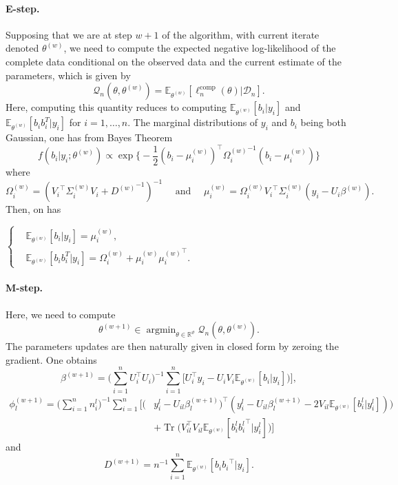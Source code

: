 \documentclass[11pt]{article}
\DeclareMathOperator{\argmin}{argmin}
\DeclareMathOperator{\Tr}{Tr}
\newcommand{\cD}{\mathcal D}
\newcommand{\cQ}{\mathcal Q}
\newcommand{\R}{\mathds R}
\newcommand{\E}{\mathds E}
\begin{document}
\paragraph*{E-step.}
Supposing that we are at step $w + 1$ of the algorithm, with current iterate denoted $\theta^{(w)}$, we need to compute the expected negative log-likelihood of the complete data conditional on the observed data and the current estimate of the parameters, which is given by 
\[\cQ_n(\theta, \theta^{(w)}) = \E_{\theta^{(w)}}[\ell_n^\text{comp}(\theta) | \cD_n].\]
Here, computing this quantity reduces to computing $\E_{\theta^{(w)}}[b_i | y_i]$ and $\E_{\theta^{(w)}}[b_ib_i^T | y_i]$ for $i = 1,\ldots,n$.
The marginal distributions of $y_i$ and $b_i$ being both Gaussian, one has from Bayes Theorem
\[ f(b_i|y_i; \theta^{(w)}) \propto \exp \big\{ -\dfrac12 (b_i - \mu_i^{(w)})^\top {\Omega_i^{(w)}}^{-1} (b_i - \mu_i^{(w)}) \big\}\]
where
\[\Omega_i^{(w)} = ({V_i}^\top \Sigma_i^{(w)}V_i + {D^{(w)}}^{-1})^{-1} \quad \text{ and } \quad \mu_i^{(w)} = \Omega_i^{(w)}{V_i}^\top \Sigma_i^{(w)}(y_i - U_i\beta^{(w)}).\]
Then, on has
\begin{center}
  $\left\{
    \begin{aligned}
      &\E_{\theta^{(w)}}[b_i | y_i] = \mu_i^{(w)}, \\
      &\E_{\theta^{(w)}}[b_ib_i^T | y_i] = \Omega_i^{(w)} + \mu_i^{(w)}{\mu_i^{(w)}}^\top.
    \end{aligned}
    \right.$
\end{center}

\paragraph*{M-step.}
Here, we need to compute \[\theta^{(w+1)} \in \argmin_{\theta \in \R^\vartheta} \cQ_n(\theta, \theta^{(w)}) .\]
The parameters updates are then naturally given in closed form by zeroing the gradient. One obtains
\[\beta^{(w+1)} = \Big(\sum_{i=1}^n U_{i}^\top U_{i}\Big)^{-1}  \sum_{i=1}^n \big[ U_{i}^\top  y_i - U_{i} V_{i} \E_{\theta^{(w)}}[ b_i | y_i]) \big],\]
\begin{align*}
\phi_l^{(w+1)} = \big(\sum_{i=1}^n n_i^l \big)^{-1}  \sum_{i=1}^n \Big[(&y_i^l - U_{il}\beta_l^{(w+1)})^\top (y_i^l - U_{il}\beta_l^{(w+1)} - 2V_{il}\E_{\theta^{(w)}}[b_i^l | y_i^l])) \\
&+\Tr\big(V_{il}^\top V_{il} \E_{\theta^{(w)}}[ b_i^l {b_i^l}^\top | y_i^l]\big) \Big]
\end{align*}
and \[D^{(w+1)} = n^{-1} \sum_{i=1}^n \E_{\theta^{(w)}}[ b_i {b_i}^\top | y_i].\]
\end{document}
